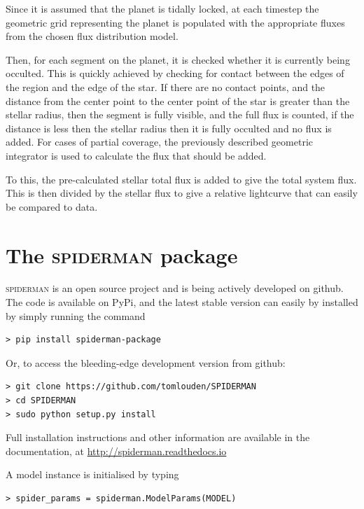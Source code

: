 \documentclass[a4paper,fleqn,usenatbib]{mnras}
\begin{document}
Since it is assumed that the planet is tidally locked, at each timestep the geometric grid representing the planet is populated with the appropriate fluxes from the chosen flux distribution model.

Then, for each segment on the planet, it is checked whether it is currently being occulted. This is quickly achieved by checking for contact between the edges of the region and the edge of the star. If there are no contact points, and the distance from the center point to the center point of the star is greater than the stellar radius, then the segment is fully visible, and the full flux is counted, if the distance is less then the stellar radius then it is fully occulted and no flux is added. For cases of partial coverage, the previously described geometric integrator is used to calculate the flux that should be added.

To this, the pre-calculated stellar total flux is added to give the total system flux. This is then divided by the stellar flux to give a relative lightcurve that can easily be compared to data.

\section{The \textsc{spiderman} package}\label{sec:package}

\textsc{spiderman} is an open source project and is being actively developed on github. The code is available on PyPi, and the latest stable version can easily by installed by simply running the command 

\begin{Verbatim}[frame=single]
> pip install spiderman-package
\end{Verbatim}

Or, to access the bleeding-edge development version from github:

\begin{Verbatim}[frame=single]
> git clone https://github.com/tomlouden/SPIDERMAN
> cd SPIDERMAN
> sudo python setup.py install
\end{Verbatim}

Full installation instructions and other information are available in the documentation, at \url{http://spiderman.readthedocs.io}

A model instance is initialised by typing

\begin{Verbatim}[frame=single]
> spider_params = spiderman.ModelParams(MODEL)
\end{Verbatim}
\end{document}
